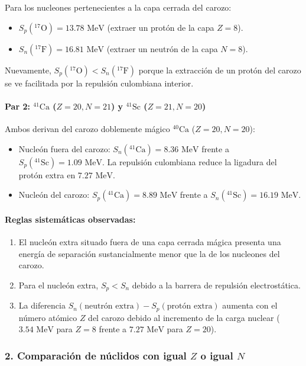 \begin{problema}
Para los nucleones pertenecientes a la capa cerrada del carozo:
\begin{itemize}
    \item $S_p({}^{17}\text{O}) = 13.78\text{ MeV}$ (extraer un protón de la capa $Z=8$).
    \item $S_n({}^{17}\text{F}) = 16.81\text{ MeV}$ (extraer un neutrón de la capa $N=8$).
\end{itemize}
Nuevamente, $S_p({}^{17}\text{O}) < S_n({}^{17}\text{F})$ porque la extracción de un protón del carozo se ve facilitada por la repulsión culombiana interior.

\paragraph{Par 2: ${}^{41}\text{Ca}$ ($Z=20, N=21$) y ${}^{41}\text{Sc}$ ($Z=21, N=20$)}
Ambos derivan del carozo doblemente mágico ${}^{40}\text{Ca}$ ($Z=20, N=20$):
\begin{itemize}
    \item Nucleón fuera del carozo: $S_n({}^{41}\text{Ca}) = 8.36\text{ MeV}$ frente a $S_p({}^{41}\text{Sc}) = 1.09\text{ MeV}$. La repulsión culombiana reduce la ligadura del protón extra en $7.27\text{ MeV}$.
    \item Nucleón del carozo: $S_p({}^{41}\text{Ca}) = 8.89\text{ MeV}$ frente a $S_n({}^{41}\text{Sc}) = 16.19\text{ MeV}$.
\end{itemize}

\paragraph{Reglas sistemáticas observadas:}
\begin{enumerate}
    \item El nucleón extra situado fuera de una capa cerrada mágica presenta una energía de separación sustancialmente menor que la de los nucleones del carozo.
    \item Para el nucleón extra, $S_p < S_n$ debido a la barrera de repulsión electrostática.
    \item La diferencia $S_n(\text{neutrón extra}) - S_p(\text{protón extra})$ aumenta con el número atómico $Z$ del carozo debido al incremento de la carga nuclear ($3.54\text{ MeV}$ para $Z=8$ frente a $7.27\text{ MeV}$ para $Z=20$).
\end{enumerate}

\subsubsection*{2. Comparación de núclidos con igual $Z$ o igual $N$}


\end{problema}
